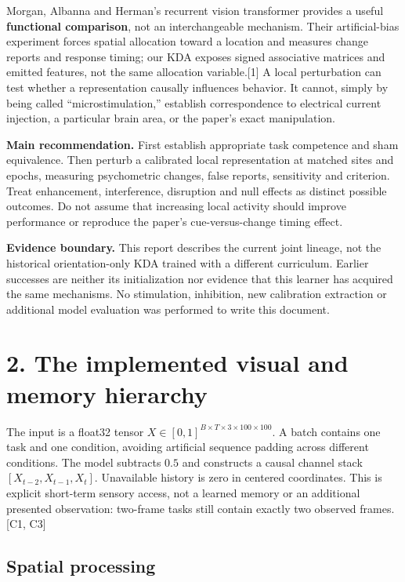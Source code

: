 \documentclass[
  10pt,
]{article}
\begin{document}
Morgan, Albanna and Herman's recurrent vision transformer provides a
useful \textbf{functional comparison}, not an interchangeable mechanism.
Their artificial-bias experiment forces spatial allocation toward a
location and measures change reports and response timing; our KDA
exposes signed associative matrices and emitted features, not the same
allocation variable.{[}1{]} A local perturbation can test whether a
representation causally influences behavior. It cannot, simply by being
called ``microstimulation,'' establish correspondence to electrical
current injection, a particular brain area, or the paper's exact
manipulation.

\textbf{Main recommendation.} First establish appropriate task
competence and sham equivalence. Then perturb a calibrated local
representation at matched sites and epochs, measuring psychometric
changes, false reports, sensitivity and criterion. Treat enhancement,
interference, disruption and null effects as distinct possible outcomes.
Do not assume that increasing local activity should improve performance
or reproduce the paper's cue-versus-change timing effect.

\textbf{Evidence boundary.} This report describes the current joint
lineage, not the historical orientation-only KDA trained with a
different curriculum. Earlier successes are neither its initialization
nor evidence that this learner has acquired the same mechanisms. No
stimulation, inhibition, new calibration extraction or additional model
evaluation was performed to write this document.

\newpage

\section{2. The implemented visual and memory
hierarchy}\label{the-implemented-visual-and-memory-hierarchy}

The input is a float32 tensor
\(X\in[0,1]^{B\times T\times3\times100\times100}\). A batch contains one
task and one condition, avoiding artificial sequence padding across
different conditions. The model subtracts \(0.5\) and constructs a
causal channel stack \([X_{t-2},X_{t-1},X_t]\). Unavailable history is
zero in centered coordinates. This is explicit short-term sensory
access, not a learned memory or an additional presented observation:
two-frame tasks still contain exactly two observed frames. {[}C1, C3{]}

\subsection{Spatial processing}\label{spatial-processing}
\end{document}
